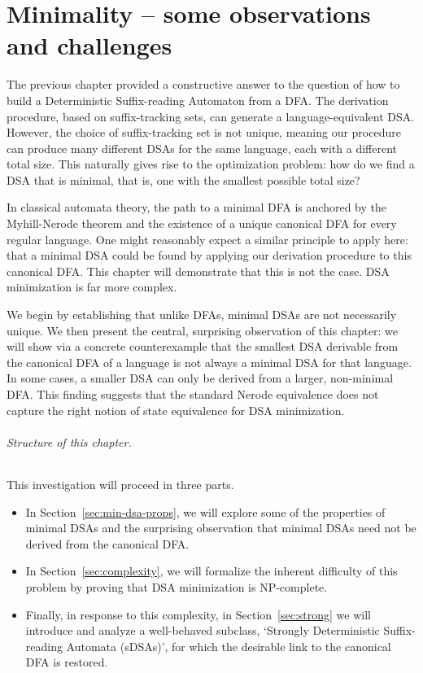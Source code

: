 
\chapter{Minimality -- some observations and challenges}
\label{sec:minim-some-observ}

The previous chapter provided a constructive answer to the question of how to build a Deterministic Suffix-reading Automaton from a DFA. The derivation procedure, based on suffix-tracking sets, can generate a language-equivalent DSA. However, the choice of  suffix-tracking set is not unique, meaning our procedure can produce many different DSAs for the same language, each with a different total size. This naturally gives rise to the optimization problem: how do we find a DSA that is minimal, that is, one with the smallest possible total size?

In classical automata theory, the path to a minimal DFA is anchored by the Myhill-Nerode theorem and the existence of a unique canonical DFA for every regular language. One might reasonably expect a similar principle to apply here: that a minimal DSA could be found by applying our derivation procedure to this canonical DFA. This chapter will demonstrate that this is not the case. DSA minimization is far more complex.

We begin by establishing that unlike DFAs, minimal DSAs are not necessarily unique. We then present the central, surprising observation of this chapter: we will show via a concrete counterexample that the smallest DSA derivable from the canonical DFA of a language is not always a minimal DSA for that language. In some cases, a smaller DSA can only be derived from a larger, non-minimal DFA. This finding suggests that the standard Nerode equivalence does not capture the right notion of state equivalence for DSA minimization.

\subparagraph*{Structure of this chapter.} This investigation will proceed in three parts. 
\begin{itemize}
  \item In Section~\ref{sec:min-dsa-props}, we will explore some of the properties of minimal DSAs and the surprising observation that minimal DSAs need not be derived from the canonical DFA.
  \item In Section~\ref{sec:complexity}, we will formalize the inherent difficulty of this problem by proving that DSA minimization is NP-complete. 
  \item Finally, in response to this complexity, in Section~\ref{sec:strong} we will introduce and analyze a well-behaved subclass, `Strongly Deterministic Suffix-reading Automata (sDSAs)', for which the desirable link to the canonical DFA is restored.
\end{itemize}
\vspace{.25cm}

